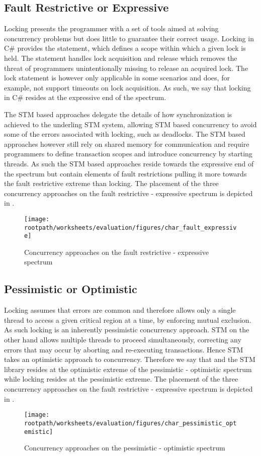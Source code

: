 \subsection{Fault Restrictive or Expressive}
Locking presents the programmer with a set of tools aimed at solving concurrency problems but does little to guarantee their correct usage. Locking in C\# provides the  statement\cite[p. 102]{csharp2013specificaiton}, which defines a scope within which a given lock is held. The  statement handles lock acquisition and release which removes the threat of programmers unintentionally missing to release an acquired lock. The lock statement is however only applicable in some scenarios and does, for example, not support timeouts on lock acquisition. As such, we say that locking in C\# resides at the expressive end of the spectrum.

The \ac{STM} based approaches delegate the details of how synchronization is achieved to the underling \ac{STM} system, allowing \ac{STM} based concurrency to avoid some of the errors associated with locking, such as deadlocks. The \ac{STM} based approaches however still rely on shared memory for communication and require programmers to define transaction scopes and introduce concurrency by starting threads. As such the \ac{STM} based approaches reside towards the expressive end of the spectrum but contain elements of fault restrictions pulling it more towards the fault restrictive extreme than locking. The placement of the three concurrency approaches on the fault restrictive - expressive spectrum is depicted in  . 
\begin{figure}[htbp]
\centering
 \texttt{[image: \\rootpath/worksheets/evaluation/figures/char\_fault\_expressive]} 
 \caption{Concurrency approaches on the fault restrictive - expressive spectrum}
\label{fig:char_fault_expressive}
\end{figure}

\subsection{Pessimistic or Optimistic}
Locking assumes that errors are common and therefore allows only a single thread to access a given critical region at a time, by enforcing mutual exclusion. As such locking is an inherently pessimistic concurrency approach. \ac{STM} on the other hand allows multiple threads to proceed simultaneously, correcting any errors that may occur by aborting and re-executing transactions. Hence \ac{STM} takes an optimistic approach to concurrency.
Therefore we say that \stmnamesp and the \ac{STM} library resides at the optimistic extreme of the pessimistic - optimistic spectrum while locking resides at the pessimistic extreme. The placement of the three concurrency approaches on the fault restrictive - expressive spectrum is depicted in . 
\begin{figure}[htbp]
\centering
 \texttt{[image: \\rootpath/worksheets/evaluation/figures/char\_pessimistic\_optemistic]} 
 \caption{Concurrency approaches on the pessimistic - optimistic spectrum}
\label{fig:char_pes_opti}
\end{figure}

